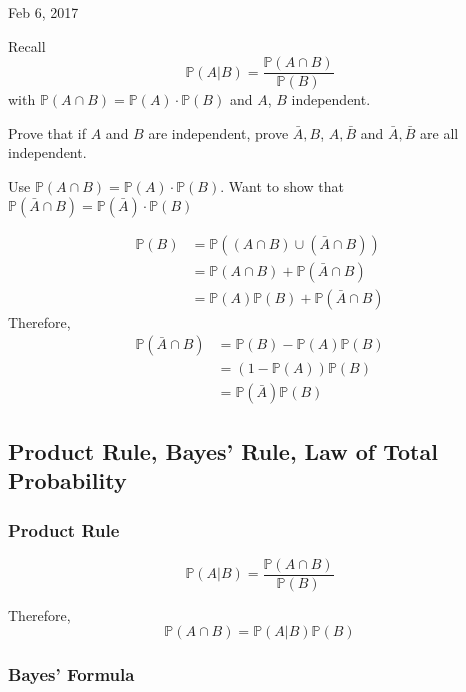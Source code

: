 \documentclass[main.tex]{subfiles}
\begin{document}
\hrulefill{}

Feb 6, 2017

\vspace{3mm}
Recall
$$\mathbb{P}(A | B) = \frac{\mathbb{P}(A\cap B)}{\mathbb{P}(B)}$$
with $\mathbb{P}(A\cap B) = \mathbb{P}(A)\cdot \mathbb{P}(B)$ and $A$, $B$ independent.

Prove that if $A$ and $B$ are independent, prove $\bar{A}, B$, $A, \bar{B}$ and $\bar{A}, \bar{B}$ are all independent.

Use $\mathbb{P}(A \cap B) = \mathbb{P}(A) \cdot \mathbb{P}(B)$. Want to show that $\mathbb{P}(\bar{A} \cap B) = \mathbb{P}(\bar{A})\cdot \mathbb{P}(B)$

\begin{align}
\mathbb{P}(B) &= \mathbb{P}((A \cap B) \cup (\bar{A} \cap B)) \\
              &= \mathbb{P}(A\cap B) + \mathbb{P}(\bar{A} \cap B) \\
              &= \mathbb{P}(A)\mathbb{P}(B) + \mathbb{P}(\bar{A} \cap B) 
\end{align}
Therefore,
\begin{align}
\mathbb{P}(\bar{A} \cap B) &= \mathbb{P}(B) - \mathbb{P}(A)\mathbb{P}(B) \\
                           &= (1 - \mathbb{P}(A))\mathbb{P}(B) \\
                           &= \mathbb{P}(\bar{A})\mathbb{P}(B)
\end{align}

\subsection{Product Rule, Bayes' Rule, Law of Total Probability}

\subsubsection{Product Rule}

$$\mathbb{P}(A | B) = \frac{\mathbb{P}(A\cap B)}{\mathbb{P}(B)}$$

Therefore,
\begin{equation}
\label{eq:product-rule}
\mathbb{P}(A\cap B) = \mathbb{P}(A | B)\mathbb{P}(B)
\end{equation}

\subsubsection{Bayes' Formula}
\end{document}
